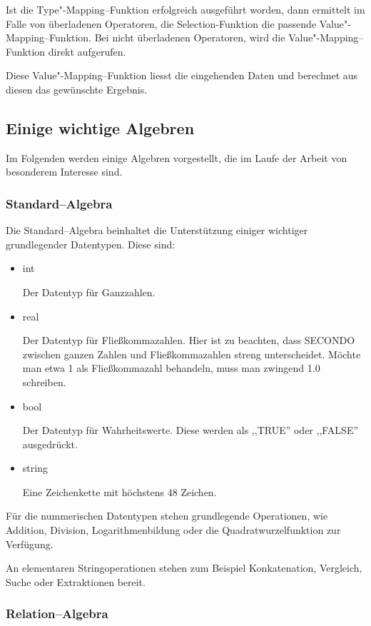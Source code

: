 Ist die Type"-Mapping--Funktion erfolgreich ausgeführt worden, dann ermittelt im Falle von überladenen Operatoren, die Selection-Funktion die passende Value"-Mapping--Funktion. Bei nicht überladenen Operatoren, wird die Value"-Mapping--Funktion direkt aufgerufen.

 Diese Value"-Mapping--Funktion liesst die eingehenden Daten und berechnet aus diesen das gewünschte Ergebnis.


\subsection{Einige wichtige Algebren}

Im Folgenden werden einige Algebren vorgestellt, die im Laufe der Arbeit von besonderem Interesse sind. 

\subsubsection{Standard--Algebra}
Die Standard--Algebra beinhaltet die Unterstützung einiger wichtiger grundlegender Datentypen. Diese sind:
\begin{itemize}
\item int

Der Datentyp für Ganzzahlen.
\item real

Der Datentyp für Fließkommazahlen. Hier ist zu beachten, dass SECONDO zwischen ganzen Zahlen und Fließkommazahlen streng unterscheidet. Möchte man etwa 1 als Fließkommazahl behandeln, muss man zwingend 1.0 schreiben.
\item bool

Der Datentyp für Wahrheitswerte. Diese werden als ,,TRUE'' oder ,,FALSE'' ausgedrückt.
\item string

Eine Zeichenkette mit höchstens 48 Zeichen. 
\end{itemize}

Für die nummerischen Datentypen stehen grundlegende Operationen, wie Addition, Division, Logarithmenbildung oder die Quadratwurzelfunktion zur Verfügung.

An elementaren Stringoperationen stehen zum Beispiel Konkatenation, Vergleich, Suche oder Extraktionen bereit.

\subsubsection{Relation--Algebra}

